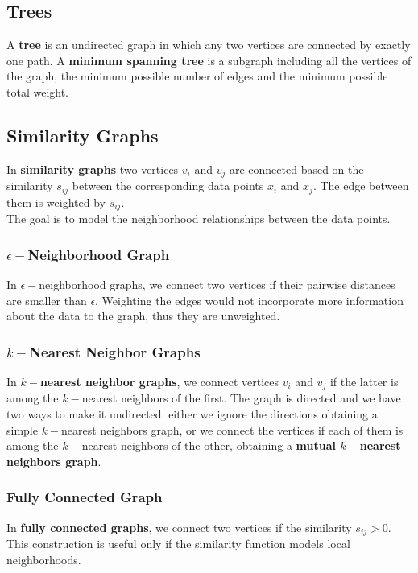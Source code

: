 \documentclass{article}
\begin{document}
\subsection{Trees}
A \textbf{tree} is an undirected graph in which any two vertices are connected by exactly one path. A \textbf{minimum spanning tree} is a subgraph including all the vertices of the graph, the minimum possible number of edges and the minimum possible total weight.
\subsection{Similarity Graphs}
In \textbf{similarity graphs} two vertices $v_i$ and $v_j$ are connected based on the similarity $s_{ij}$ between the corresponding data points $x_i$ and $x_j$. The edge between them is weighted by $s_{ij}$. \\
The goal is to model the neighborhood relationships between the data points.
\subsubsection{$\epsilon-$Neighborhood Graph}
In $\epsilon-$neighborhood graphs, we connect two vertices if their pairwise distances are smaller than $\epsilon$. Weighting the edges would not incorporate more information about the data to the graph, thus they are unweighted.
\subsubsection{$k-$Nearest Neighbor Graphs}
In \textbf{$k-$nearest neighbor graphs}, we connect vertices $v_i$ and $v_j$ if the latter is among the $k-$nearest neighbors of the first. The graph is directed and we have two ways to make it undirected: either we ignore the directions obtaining a simple $k-$nearest neighbors graph, or we connect the vertices if each of them is among the $k-$nearest neighbors of the other, obtaining a \textbf{mutual $k-$nearest neighbors graph}.
\subsubsection{Fully Connected Graph}
In \textbf{fully connected graphs}, we connect two vertices if the similarity $s_{ij} > 0$. This construction is useful only if the similarity function models local neighborhoods.
\newpage
\end{document}
